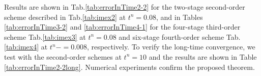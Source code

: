 \documentclass[a4paper, oneside]{book}
\def\u{{\mathbf{u}}}
\begin{document}
{Results are shown in Tab.\ref{tab:errorInTime2-2} for the two-stage second-order scheme  described in Tab.\ref{tab:imex2} at $t^n=0.08$, and in Tables \ref{tab:errorInTime3-2} and  \ref{tab:errorInTime4-1} for the four-stage third-order scheme Tab.\ref{tab:imex3} at $t^n=0.08$ and six-stage fourth-order scheme Tab.\ref{tab:imex4} at $t^n-=0.008$, respectively.  To verify the long-time convergence, we test with the second-order schemes at $t^n=10$ and the results are shown in Table \ref{tab:errorInTime2-2long}. Numerical experiments confirm the proposed theorem.




}
\end{document}
